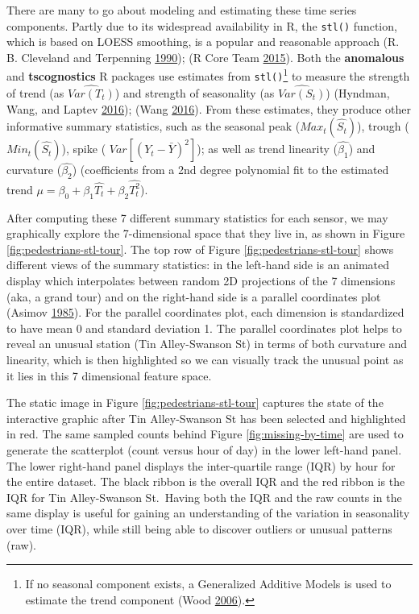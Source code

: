 \documentclass[12pt,]{isuthesis}
\let\rmarkdownfootnote\footnote%
\def\footnote{\protect\rmarkdownfootnote}
\begin{document}
There are many to go about modeling and estimating these time series
components. Partly due to its widespread availability in R, the
\texttt{stl()} function, which is based on LOESS smoothing, is a popular
and reasonable approach (R. B. Cleveland and Terpenning
\protect\hyperlink{ref-stl}{1990}); (R Core Team
\protect\hyperlink{ref-RCore}{2015}). Both the \textbf{anomalous} and
\textbf{tscognostics} R packages use estimates from
\texttt{stl()}\footnote{If no seasonal component exists, a Generalized
  Additive Models is used to estimate the trend component (Wood
  \protect\hyperlink{ref-mgcv}{2006}).} to measure the strength of trend
(as \(\hat{Var(T_t)}\)) and strength of seasonality (as
\(\hat{Var(S_t)}\)) (Hyndman, Wang, and Laptev
\protect\hyperlink{ref-anomalous}{2016}); (Wang
\protect\hyperlink{ref-tscognostics}{2016}). From these estimates, they
produce other informative summary statistics, such as the seasonal peak
(\(Max_{t}(\hat{S_t})\)), trough (\(Min_{t}(\hat{S_t})\)), spike (
\(Var[(Y_t - \bar{Y})^2]\)); as well as trend linearity
(\(\hat{\beta_1}\)) and curvature (\(\hat{\beta_2}\)) (coefficients from
a 2nd degree polynomial fit to the estimated trend
\(\mu = \beta_0 + \beta_1\hat{T_t} + \beta_2\hat{T_t^2}\)).

After computing these 7 different summary statistics for each sensor, we
may graphically explore the 7-dimensional space that they live in, as
shown in Figure \ref{fig:pedestrians-stl-tour}. The top row of Figure
\ref{fig:pedestrians-stl-tour} shows different views of the summary
statistics: in the left-hand side is an animated display which
interpolates between random 2D projections of the 7 dimensions (aka, a
grand tour) and on the right-hand side is a parallel coordinates plot
(Asimov \protect\hyperlink{ref-grand-tour}{1985}). For the parallel
coordinates plot, each dimension is standardized to have mean 0 and
standard deviation 1. The parallel coordinates plot helps to reveal an
unusual station (Tin Alley-Swanson St) in terms of both curvature and
linearity, which is then highlighted so we can visually track the
unusual point as it lies in this 7 dimensional feature space.

The static image in Figure \ref{fig:pedestrians-stl-tour} captures the
state of the interactive graphic after Tin Alley-Swanson St has been
selected and highlighted in red. The same sampled counts behind Figure
\ref{fig:missing-by-time} are used to generate the scatterplot (count
versus hour of day) in the lower left-hand panel. The lower right-hand
panel displays the inter-quartile range (IQR) by hour for the entire
dataset. The black ribbon is the overall IQR and the red ribbon is the
IQR for Tin Alley-Swanson St.~Having both the IQR and the raw counts in
the same display is useful for gaining an understanding of the variation
in seasonality over time (IQR), while still being able to discover
outliers or unusual patterns (raw).
\end{document}

